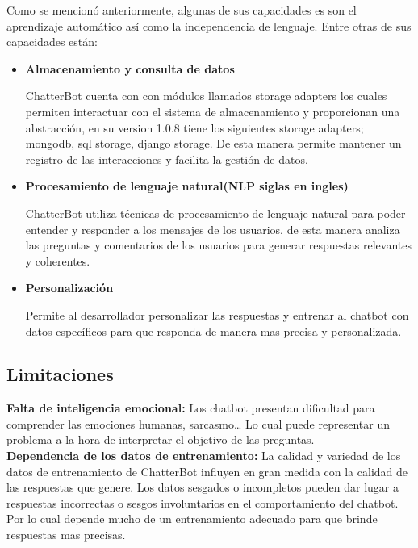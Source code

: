 \documentclass[a4paper,12pt]{article}
\begin{document}
Como se mencionó anteriormente, algunas de sus capacidades es son el aprendizaje automático así como la independencia 
de lenguaje. Entre otras de sus capacidades están:

\begin{itemize}
    \item \textbf{Almacenamiento y consulta de datos}
    
    ChatterBot cuenta con con módulos llamados storage adapters los cuales permiten interactuar con el sistema de almacenamiento 
    y proporcionan una abstracción, en su version 1.0.8 tiene los siguientes storage adapters; mongodb, sql$\_$storage, django$\_$storage. 
    De esta manera permite mantener un registro de las interacciones y facilita la gestión de datos.

    \item \textbf{Procesamiento de lenguaje natural(NLP siglas en ingles)}
    
    ChatterBot utiliza técnicas de procesamiento de lenguaje natural para poder entender y responder a los mensajes de los usuarios, 
    de esta manera analiza las preguntas y comentarios de los usuarios para generar respuestas relevantes y coherentes.

    \item \textbf{Personalización}
    
    Permite al desarrollador personalizar las respuestas y entrenar al chatbot con datos específicos para que 
    responda de manera mas precisa y personalizada. 
\end{itemize}


\subsection{Limitaciones}

\textbf{Falta de inteligencia emocional:} Los chatbot presentan dificultad para comprender las emociones humanas, 
sarcasmo… Lo cual puede representar un problema a la hora de interpretar el objetivo de las preguntas.\\

\textbf{Dependencia de los datos de entrenamiento:} La calidad y variedad de los datos de entrenamiento de ChatterBot 
influyen en gran medida con la calidad de las respuestas que genere. Los datos sesgados o incompletos pueden dar 
lugar a respuestas incorrectas o sesgos involuntarios en el comportamiento del chatbot. Por lo cual depende mucho de 
un entrenamiento adecuado para que brinde respuestas mas precisas.\\
\end{document}
